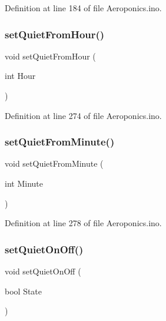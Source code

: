 Definition at line 184 of file Aeroponics.\+ino.

\mbox{\label{_aeroponics_8ino_a913932a7a16c2d8a5f017b7dece91be0}} 
\subsubsection{\texorpdfstring{setQuietFromHour()}{setQuietFromHour()}}
{\footnotesize\ttfamily void set\+Quiet\+From\+Hour (\begin{DoxyParamCaption}\item[{int}]{Hour }\end{DoxyParamCaption})}



Definition at line 274 of file Aeroponics.\+ino.

\mbox{\label{_aeroponics_8ino_a932d3d547294916c9e3fa435a6c97103}} 
\subsubsection{\texorpdfstring{setQuietFromMinute()}{setQuietFromMinute()}}
{\footnotesize\ttfamily void set\+Quiet\+From\+Minute (\begin{DoxyParamCaption}\item[{int}]{Minute }\end{DoxyParamCaption})}



Definition at line 278 of file Aeroponics.\+ino.

\mbox{\label{_aeroponics_8ino_a7baea56d0669cb68d93b050a42de96fe}} 
\subsubsection{\texorpdfstring{setQuietOnOff()}{setQuietOnOff()}}
{\footnotesize\ttfamily void set\+Quiet\+On\+Off (\begin{DoxyParamCaption}\item[{bool}]{State }\end{DoxyParamCaption})}




